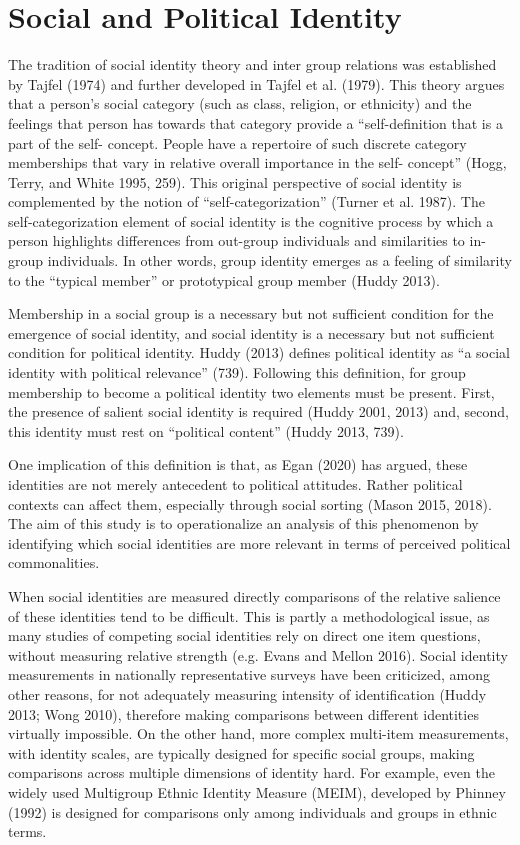 \documentclass[a4paper]{cupjournal}
\begin{document}
\hypertarget{social-and-political-identity}{%
\section{Social and Political Identity}\label{social-and-political-identity}}

The tradition of social identity theory and inter group relations was established by Tajfel (1974) and further developed in Tajfel et al. (1979). This theory argues that a person's social category (such as class, religion, or ethnicity) and the feelings that person has towards that category provide a ``self-definition that is a part of the self- concept. People have a repertoire of such discrete category memberships that vary in relative overall importance in the self- concept'' (Hogg, Terry, and White 1995, 259). This original perspective of social identity is complemented by the notion of ``self-categorization'' (Turner et al. 1987). The self-categorization element of social identity is the cognitive process by which a person highlights differences from out-group individuals and similarities to in-group individuals. In other words, group identity emerges as a feeling of similarity to the ``typical member'' or prototypical group member (Huddy 2013).

Membership in a social group is a necessary but not sufficient condition for the emergence of social identity, and social identity is a necessary but not sufficient condition for political identity. Huddy (2013) defines political identity as ``a social identity with political relevance'' (739).
Following this definition, for group membership to become a political identity two elements must be present. First, the presence of salient social identity is required (Huddy 2001, 2013) and, second, this identity must rest on ``political content'' (Huddy 2013, 739).

One implication of this definition is that, as Egan (2020) has argued, these identities are not merely antecedent to political attitudes. Rather political contexts can affect them, especially through social sorting (Mason 2015, 2018). The aim of this study is to operationalize an analysis of this phenomenon by identifying which social identities are more relevant in terms of perceived political commonalities.

When social identities are measured directly comparisons of the relative salience of these identities tend to be difficult. This is partly a methodological issue, as many studies of competing social identities rely on direct one item questions, without measuring relative strength (e.g. Evans and Mellon 2016). Social identity measurements in nationally representative surveys have been criticized, among other reasons, for not adequately measuring intensity of identification (Huddy 2013; Wong 2010), therefore making comparisons between different identities virtually impossible. On the other hand, more complex multi-item measurements, with identity scales, are typically designed for specific social groups, making comparisons across multiple dimensions of identity hard. For example, even the widely used Multigroup Ethnic Identity Measure (MEIM), developed by Phinney (1992) is designed for comparisons only among individuals and groups in ethnic terms.
\end{document}

